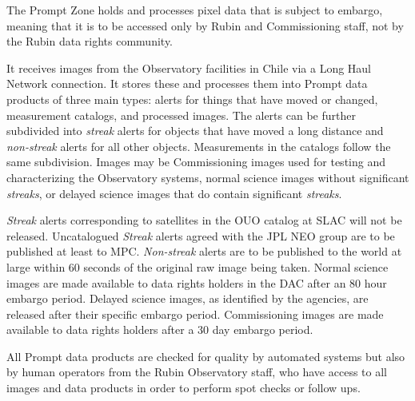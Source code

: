 The Prompt \gls{Zone} holds and processes pixel data that is subject to embargo, meaning that it is to be accessed only by Rubin and \gls{Commissioning} staff, not by the Rubin data rights community.

It receives images from the Observatory facilities in Chile via a Long Haul Network connection.
It stores these and processes them into Prompt data products of three main types:
alerts for things that have moved or changed, measurement catalogs, and processed images.
The alerts can be further subdivided into \emph{streak} alerts for objects that have moved a long distance and \emph{non-streak} alerts for all other objects.
Measurements in the catalogs follow the same subdivision. Images may be \gls{Commissioning} images used for testing and characterizing the Observatory systems, normal science images without significant \emph{streaks}, or delayed science images that do contain significant \emph{streaks}.

\emph{Streak} alerts corresponding to satellites in the \gls{OUO} catalog at \gls{SLAC} will not be released.
Uncatalogued \emph{Streak} alerts agreed with the \gls{JPL} \gls{NEO} group  are to be published at least to \gls{MPC}.
\emph{Non-streak} alerts are to be published to the world at large within 60 seconds of the original raw image being taken.
Normal science images are made available to data rights holders in the \gls{DAC} after an 80 hour embargo period.
Delayed science images, as identified by the agencies, are released after their specific embargo period. \gls{Commissioning} images are made available to data rights holders after a 30 day embargo period.

All Prompt data products are checked for quality by automated systems but also by human operators from the Rubin Observatory staff, who have access to all images and data products in order to perform spot checks or follow ups.

